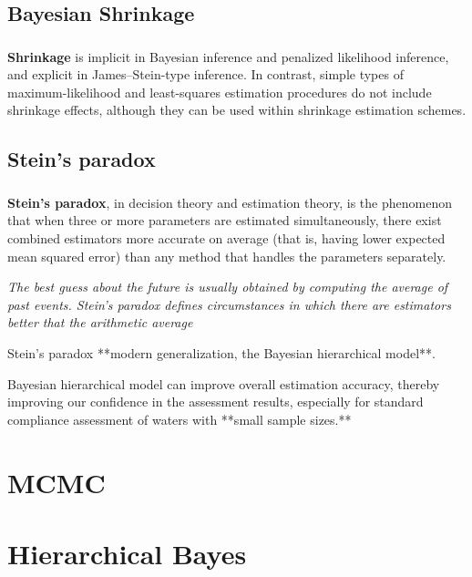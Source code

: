 \documentclass[c, dvipsnames]{beamer}  %
\begin{document}
\subsection{Bayesian Shrinkage}


\begin{frame}[shrink=5]
\frametitle{\insertsection} 
\framesubtitle{\insertsubsection}

\textbf{Shrinkage} is implicit in Bayesian inference and penalized likelihood inference, and explicit in James–Stein-type inference. In contrast, simple types of maximum-likelihood and least-squares estimation procedures do not include shrinkage effects, although they can be used within shrinkage estimation schemes.
 
 
 
\end{frame}

\subsection{Stein's  paradox}


\begin{frame}[shrink=5]
\frametitle{\insertsection} 
\framesubtitle{\insertsubsection}
 
 
\textbf{Stein's  paradox}, in decision theory and estimation theory, is the phenomenon that when three or more parameters are estimated simultaneously, there exist combined estimators more accurate on average (that is, having lower expected mean squared error) than any method that handles the parameters separately. 

\textit{The best guess about the future is usually  obtained by computing the average of past events. Stein's paradox defines circumstances in which there are estimators better that the arithmetic average
}

Stein’s paradox  **modern generalization, the Bayesian hierarchical model**. 

Bayesian hierarchical model can improve overall estimation accuracy, thereby improving our confidence in the assessment results, especially for standard compliance assessment of waters with **small sample sizes.**


\end{frame}
 
\section{MCMC}
 
 
\section{Hierarchical Bayes}
\end{document}
